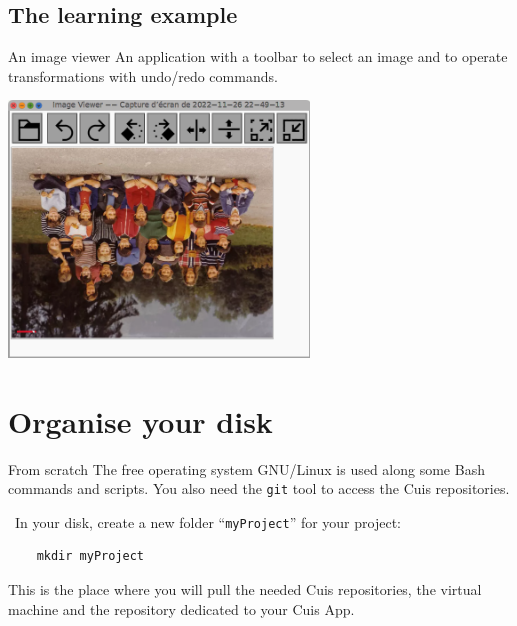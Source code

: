 \documentclass{beamer}
\newcommand{\tip}{\boldmath{\textcolor{red}{$\Rightarrow$}}}
\begin{document}
\subsection{The learning example}
\begin{frame}{An image viewer}
  An application with a toolbar to select an image and to operate
  transformations with undo/redo commands.
\begin{center}
  \includegraphics[width=0.6\textwidth]{CuisApp.png}
\end{center}
\end{frame}



\section{Organise your disk}
\begin{frame}[fragile]{From scratch}
  The free operating system GNU/Linux is used along some Bash commands
  and scripts. You also need the \texttt{git} tool to access the Cuis
  repositories.
  
  \tip\ In your disk, create a new folder ``\texttt{myProject}'' for
  your project:
\begin{verbatim}
    mkdir myProject
\end{verbatim}

  This is the place where you will pull the needed Cuis repositories,
  the virtual machine and the repository dedicated to your Cuis App.
\end{frame}
\end{document}
